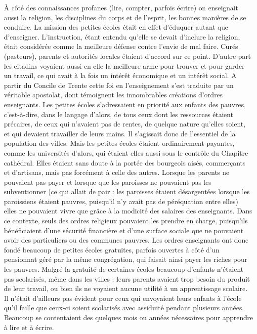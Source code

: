  À côté des connaissances profanes (lire, compter, parfois écrire) on enseignait aussi la religion, les disciplines du corps et de l'esprit, les bonnes manières de se conduire. La mission des petites écoles était en effet d'éduquer autant que d'enseigner. L'instruction, étant entendu qu'elle se devait d'inclure la religion, était considérée comme la meilleure défense contre l'envie de mal faire. Curés (pasteurs), parents et autorités locales étaient d'accord sur ce point. D'autre part les citadins voyaient aussi en elle la meilleure arme pour trouver et pour garder un travail, ce qui avait à la fois un intérêt économique et un intérêt social. A partir du Concile de Trente cette foi en l'enseignement s'est traduite par un véritable apostolat, dont témoignent les innombrables créations d'ordres enseignants. 
 Les petites écoles s'adressaient en priorité aux enfants des pauvres, c'est-à-dire, dans le langage d'alors, de tous ceux dont les ressources étaient précaires, de ceux qui n'avaient pas de rentes, de quelque nature qu'elles soient, et qui devaient travailler de leurs mains. Il s'agissait donc de l'essentiel de la population des villes. Mais les petites écoles étaient ordinairement payantes, comme les universités d'alors, qui étaient elles aussi sous le contrôle du Chapitre cathédral. Elles étaient sans doute à la portée des bourgeois aisés, commerçants et d'artisans, mais pas forcément à celle des autres. Lorsque les parents ne pouvaient pas payer et lorsque que les paroisses ne pouvaient pas les subventionner (ce qui allait de pair : les paroisses étaient désargentées lorsque les paroissiens étaient pauvres, puisqu'il n'y avait pas de péréquation entre elles) elles ne pouvaient vivre que grâce à la modicité des salaires des enseignants. Dans ce contexte, seuls des ordres religieux pouvaient les prendre en charge, puisqu'ils bénéficiaient d'une sécurité financière et d'une surface sociale que ne pouvaient avoir des particuliers ou des communes pauvres. Les ordres enseignants ont donc fondé beaucoup de petites écoles gratuites, parfois ouvertes à côté d'un pensionnat géré par la même congrégation, qui faisait ainsi payer les riches pour les pauvres. 
 Malgré la gratuité de certaines écoles beaucoup d'enfants n'étaient pas scolarisés, même dans les villes : leurs parents avaient trop besoin du produit de leur travail, ou bien ils ne voyaient aucune utilité à un apprentissage scolaire. Il n'était d'ailleurs pas évident pour ceux qui envoyaient leurs enfants à l'école qu'il faille que ceux-ci soient scolarisés avec assiduité pendant plusieurs années. Beaucoup se contentaient des quelques mois ou années nécessaires pour apprendre à lire et à écrire.

